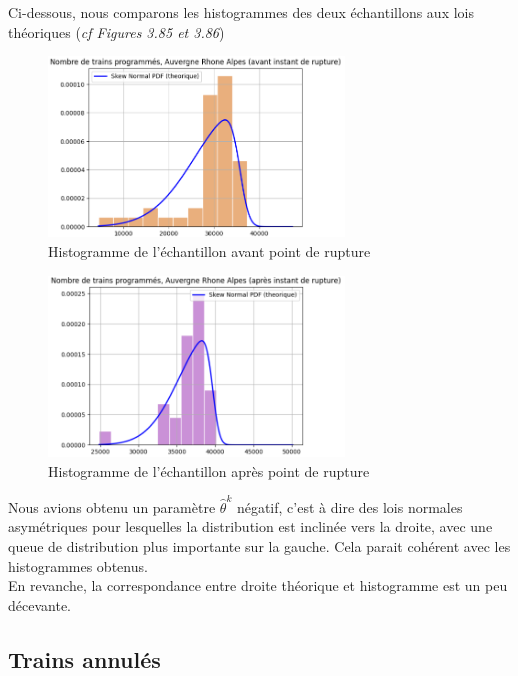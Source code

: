 {Ci-dessous, nous comparons les histogrammes des deux échantillons aux lois théoriques (\textit{cf Figures 3.85 et 3.86})

\begin{figure}[H]
  \centering
  \includegraphics[width=0.7\textwidth]{image/ARA_TP_4.png}
  \caption{Histogramme de l'échantillon avant point de rupture}
\end{figure}

\begin{figure}[H]
  \centering
  \includegraphics[width=0.7\textwidth]{image/ARA_TP_5.png}
  \caption{Histogramme de l'échantillon après point de rupture}
\end{figure}

Nous avions obtenu un paramètre $\hat{\theta}^k$ négatif, c'est à dire des lois normales asymétriques pour lesquelles la distribution est inclinée vers la droite, avec une queue de distribution plus importante sur la gauche. Cela parait cohérent avec les histogrammes obtenus.\\

En revanche, la correspondance entre droite théorique et histogramme est un peu décevante.

\subsection{Trains annulés}

}
